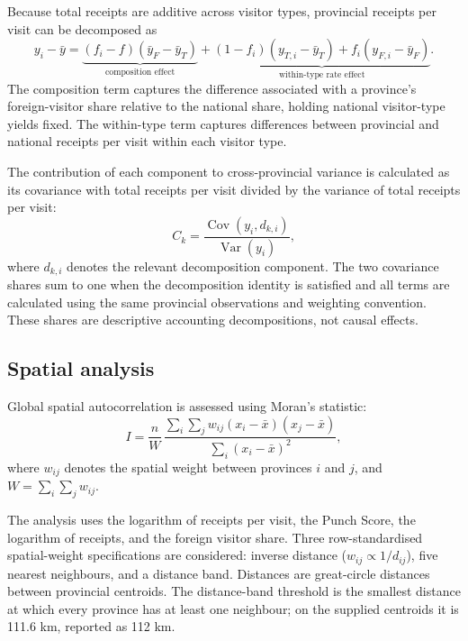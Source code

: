 \documentclass[11pt,a4paper]{article}
\theoremstyle{plain}\newtheorem{proposition}{Proposition}
\theoremstyle{definition}\newtheorem{definition}{Definition}
\begin{document}
Because total receipts are additive across visitor types, provincial receipts per visit can be decomposed as
\begin{equation}
y_i-\bar y=\underbrace{(f_i-f)(\bar y_F-\bar y_T)}_{\text{composition effect}}+\underbrace{(1-f_i)(y_{T,i}-\bar y_T)+f_i(y_{F,i}-\bar y_F)}_{\text{within-type rate effect}}.
\end{equation}
The composition term captures the difference associated with a province's foreign-visitor share relative to the national share, holding national visitor-type yields fixed. The within-type term captures differences between provincial and national receipts per visit within each visitor type.

The contribution of each component to cross-provincial variance is calculated as its covariance with total receipts per visit divided by the variance of total receipts per visit:
\begin{equation}
C_k=\frac{\operatorname{Cov}(y_i,d_{k,i})}{\operatorname{Var}(y_i)},
\end{equation}
where $d_{k,i}$ denotes the relevant decomposition component. The two covariance shares sum to one when the decomposition identity is satisfied and all terms are calculated using the same provincial observations and weighting convention. These shares are descriptive accounting decompositions, not causal effects.

\subsection{Spatial analysis}
Global spatial autocorrelation is assessed using Moran's statistic:
\begin{equation}
I=\frac{n}{W}\,\frac{\sum_i\sum_j w_{ij}(x_i-\bar x)(x_j-\bar x)}{\sum_i(x_i-\bar x)^2},
\end{equation}
where $w_{ij}$ denotes the spatial weight between provinces $i$ and $j$, and $W=\sum_i\sum_j w_{ij}$.

The analysis uses the logarithm of receipts per visit, the Punch Score, the logarithm of receipts, and the foreign visitor share. Three row-standardised spatial-weight specifications are considered: inverse distance ($w_{ij}\propto 1/d_{ij}$), five nearest neighbours, and a distance band. Distances are great-circle distances between provincial centroids. The distance-band threshold is the smallest distance at which every province has at least one neighbour; on the supplied centroids it is 111.6 km, reported as 112 km.
\end{document}
